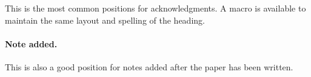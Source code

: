 \documentclass[a4paper,11pt]{article}
\begin{document}
\acknowledgments

This is the most common positions for acknowledgments. A macro is
available to maintain the same layout and spelling of the heading.

\paragraph{Note added.} This is also a good position for notes added
after the paper has been written.





\end{document}
